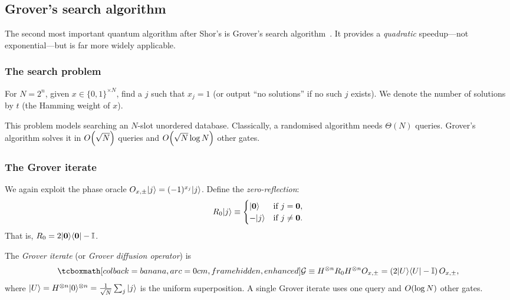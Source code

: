 \subsection{Grover's search algorithm}\label{subsec:grover}

The second most important quantum algorithm after Shor's is Grover's search
algorithm~\cite{Grover1996}.  It provides a \emph{quadratic} speedup---not
exponential---but is far more widely applicable.

\subsubsection{The search problem}

\begin{keyresult}
  For $N=2^n$, given $x\in \{0,1\}^{\times N}$, find a $j$ such that
  $x_j = 1$ (or output ``no solutions'' if no such $j$ exists).  We denote
  the number of solutions by $t$ (the Hamming weight of $x$).
\end{keyresult}

This problem models searching an $N$-slot unordered database. Classically,
a randomised algorithm needs $\Theta(N)$ queries.  Grover's algorithm solves
it in $O\!\left(\sqrt{N}\right)$ queries and $O\!\left(\sqrt{N}\log N\right)$ other gates.

\subsubsection{The Grover iterate}

We again exploit the phase oracle $O_{x,\pm}|j\rangle = (-1)^{x_j}|j\rangle$.
Define the \emph{zero-reflection}:
\begin{equation}
  R_0|j\rangle \equiv \begin{cases}
    |\mathbf{0}\rangle & \text{if } j= \mathbf{0}, \\
    -|j\rangle         & \text{if } j\not= \mathbf{0}.
  \end{cases}
\end{equation}
That is, $R_0 = 2|\mathbf{0}\rangle\langle\mathbf{0}| - \mathbb{I}$.

\begin{definition}\label{def:grover-iterate}
  The \emph{Grover iterate} (or \emph{Grover diffusion operator}) is
  \begin{equation}
    \eqbox{\mathcal{G} \equiv H^{\tp n}R_0 H^{\tp n}\Oxpm
    = \left(2\ket{U}\bra{U} - \I\right)\Oxpm,}
  \end{equation}
  where $|U\rangle = H^{\otimes n}|0\rangle^{\otimes n}
  = \frac{1}{\sqrt{N}}\sum_j|j\rangle$ is the uniform superposition.
  A single Grover iterate uses one query and $O\!\left(\log N\right)$ other gates.
\end{definition}


